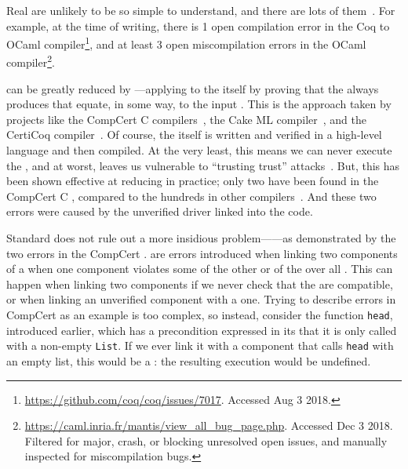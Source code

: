 Real  are unlikely to be so simple to understand,
and there are lots of them~\cite{yang2011:csmith}.
For example, at the time of writing, there is 1 open compilation error in the
Coq to OCaml compiler\footnote{\url{https://github.com/coq/coq/issues/7017}.
  Accessed Aug 3 2018.}, and at least 3 open miscompilation errors in the OCaml
compiler\footnote{\url{https://caml.inria.fr/mantis/view_all_bug_page.php}.
  Accessed Dec 3 2018. Filtered for major, crash, or blocking unresolved open
  issues, and manually inspected for miscompilation bugs.}.

 can be greatly reduced by ---applying
 to the  itself by proving that the
 always produces  that equate, in some way, to the
input .
This is the approach taken by projects like the CompCert C
compilers~\cite{leroy2009:compcert-jfp}, the Cake ML compiler~\cite{kumar2014},
and the CertiCoq compiler~\cite{anand2017}.
Of course, the  itself is written and verified in a
high-level language and then compiled.
At the very least, this means we can never execute the 
, and at worst, leaves us vulnerable to ``trusting trust''
attacks~\cite{thompson1984}.
But, this has been shown effective at reducing  in
practice; only two  have been found in the
 CompCert C , compared to the hundreds in other
compilers~\cite{yang2011:csmith}.
And these two errors were caused by the unverified driver linked into the
 code.

Standard  does not rule out a more insidious
problem---\emph{}---as demonstrated by the two errors in
the  CompCert .
 are errors introduced when linking two components of a
 when one component violates some  of the
other or of the over all .
This can happen when linking two  components if we never check
that the  are compatible, or when linking an unverified
component with a  one.
Trying to describe errors in CompCert as an example is too complex, so instead,
consider the function \texttt{head}, introduced earlier, which has a
precondition expressed in its  that it is only called with a
non-empty \texttt{List}.
If we ever link it with a component that calls \texttt{head} with an
empty list, this would be a : the resulting execution would
be undefined.

